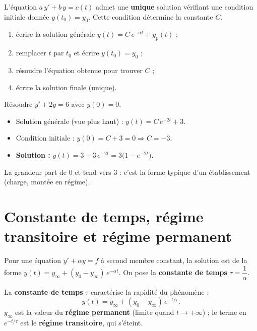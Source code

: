 \documentclass[a4paper,11pt]{article}
\begin{document}
\begin{theoreme}
L'équation $a\,y' + b\,y = c(t)$ admet une \textbf{unique} solution vérifiant une condition initiale donnée $y(t_0) = y_0$. Cette condition détermine la constante $C$.
\end{theoreme}

\begin{methode}
\begin{enumerate}
  \item écrire la solution générale $y(t) = C\,e^{-\alpha t} + y_p(t)$ ;
  \item remplacer $t$ par $t_0$ et écrire $y(t_0) = y_0$ ;
  \item résoudre l'équation obtenue pour trouver $C$ ;
  \item écrire la solution finale (unique).
\end{enumerate}
\end{methode}

\begin{exemple}
Résoudre $y' + 2y = 6$ avec $y(0) = 0$.
\begin{itemize}
  \item Solution générale (vue plus haut) : $y(t) = C\,e^{-2t} + 3$.
  \item Condition initiale : $y(0) = C + 3 = 0 \Rightarrow C = -3$.
  \item \textbf{Solution :} $y(t) = 3 - 3\,e^{-2t} = 3\big(1 - e^{-2t}\big)$.
\end{itemize}
La grandeur part de $0$ et tend vers $3$ : c'est la forme typique d'un établissement (charge, montée en régime).
\end{exemple}

\newpage
\section{Constante de temps, régime transitoire et régime permanent}

Pour une équation $y' + \alpha y = f$ à second membre constant, la solution est de la forme $y(t) = y_\infty + (y_0 - y_\infty)\,e^{-\alpha t}$. On pose la \textbf{constante de temps} $\tau = \dfrac{1}{\alpha}$.

\begin{definition}
La \textbf{constante de temps} $\tau$ caractérise la rapidité du phénomène :
\[
y(t) = y_\infty + (y_0 - y_\infty)\,e^{-t/\tau}.
\]
$y_\infty$ est la valeur du \textbf{régime permanent} (limite quand $t \to +\infty$) ; le terme en $e^{-t/\tau}$ est le \textbf{régime transitoire}, qui s'éteint.
\end{definition}
\end{document}

